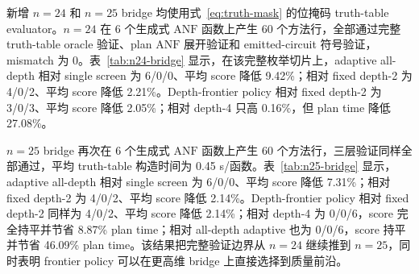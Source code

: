 \documentclass[UTF8,fontset=macnew,11pt]{ctexart}
\newcommand{\anf}{\ensuremath{\mathrm{ANF}}}
\newcommand{\ttable}{truth-table}
\begin{document}
新增 $n=24$ 和 $n=25$ bridge 均使用式~\eqref{eq:truth-mask} 的位掩码 truth-table evaluator。$n=24$ 在 6 个生成式 \anf{} 函数上产生 60 个方法行，全部通过完整 \ttable{} oracle 验证、plan \anf{} 展开验证和 emitted-circuit 符号验证，mismatch 为 0。表~\ref{tab:n24-bridge} 显示，在该完整枚举切片上，adaptive all-depth 相对 single screen 为 6/0/0、平均 score 降低 9.42\%；相对 fixed depth-2 为 4/0/2、平均 score 降低 2.21\%。Depth-frontier policy 相对 fixed depth-2 为 3/0/3、平均 score 降低 2.05\%；相对 depth-4 只高 0.16\%，但 plan time 降低 27.08\%。

$n=25$ bridge 再次在 6 个生成式 \anf{} 函数上产生 60 个方法行，三层验证同样全部通过，平均 truth-table 构造时间为 0.45 s/函数。表~\ref{tab:n25-bridge} 显示，adaptive all-depth 相对 single screen 为 6/0/0、平均 score 降低 7.31\%；相对 fixed depth-2 为 4/0/2、平均 score 降低 2.14\%。Depth-frontier policy 相对 fixed depth-2 同样为 4/0/2、平均 score 降低 2.14\%；相对 depth-4 为 0/0/6，score 完全持平并节省 8.87\% plan time；相对 all-depth adaptive 也为 0/0/6，score 持平并节省 46.09\% plan time。该结果把完整验证边界从 $n=24$ 继续推到 $n=25$，同时表明 frontier policy 可以在更高维 bridge 上直接选择到质量前沿。

\begin{table}[H]
\centering
\scriptsize
\caption{$n=24$ 完整 truth-table bridge 的资源比较。}
\label{tab:n24-bridge}

\end{table}

\begin{table}[H]
\centering
\scriptsize
\caption{$n=25$ 完整 truth-table bridge 的资源比较。}
\label{tab:n25-bridge}

\end{table}
\end{document}
